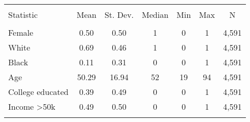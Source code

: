 
\begin{tabular}{@{\extracolsep{5pt}}lcccccc} 
\\[-1.8ex]\hline 
\hline \\[-1.8ex] 
Statistic & \multicolumn{1}{c}{Mean} & \multicolumn{1}{c}{St. Dev.} & \multicolumn{1}{c}{Median} & \multicolumn{1}{c}{Min} & \multicolumn{1}{c}{Max} & \multicolumn{1}{c}{N} \\ 
\hline \\[-1.8ex] 
Female & 0.50 & 0.50 & 1 & 0 & 1 & 4,591 \\ 
White & 0.69 & 0.46 & 1 & 0 & 1 & 4,591 \\ 
Black & 0.11 & 0.31 & 0 & 0 & 1 & 4,591 \\ 
Age & 50.29 & 16.94 & 52 & 19 & 94 & 4,591 \\ 
College educated & 0.39 & 0.49 & 0 & 0 & 1 & 4,591 \\ 
Income \textgreater 50k & 0.49 & 0.50 & 0 & 0 & 1 & 4,591 \\ 
\hline \\[-1.8ex] 
\end{tabular} 
